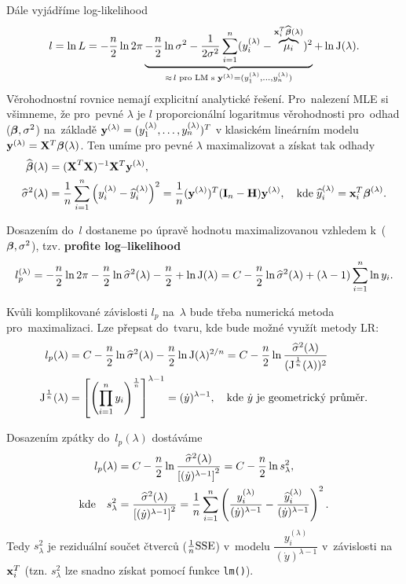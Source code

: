 Dále vyjádříme log-likelihood
 $$
 l = \ln L = -\frac{n}{2}\ln 2 \pi \underbrace{- \frac{n}{2}\ln \sigma^2 - \frac{1}{2 \sigma^2} \sum\limits_{i=1}^{n} (y_i^{(\lambda)} - \overbrace{\mu_i}^{\mathbf{x}_i^T \widehat{\boldsymbol{\beta}}(\lambda)})^2}_{\approx \, l \text{ pro LM s } \mathbf{y}^{(\lambda)} = (y_1^{(\lambda)}, \dots, y_n^{(\lambda)})} + \ln\text{J}(\lambda).
 $$
Věrohodnostní rovnice nemají explicitní analytické řešení. Pro~nalezení MLE si všimneme, že pro~pevné $\lambda$ je $l$ proporcionální logaritmus věrohodnosti pro~odhad ($\boldsymbol{\beta}, \sigma^2$) na~základě $\mathbf{y}^{(\lambda)} = (y_1^{(\lambda)},\dots, y_n^{(\lambda)})^T$ v klasickém lineárním modelu $\mathbf{y}^{(\lambda)} = \mathbf{X}^T \boldsymbol{\beta}(\lambda)$. Ten umíme pro pevné $\lambda$ maximalizovat a získat tak odhady
 \begin{align*}
 \widehat{\boldsymbol{\beta}} (\lambda) & = {(\textbf{X}^T\textbf{X})^{-1}} \mathbf{X}^T \mathbf{y}^{(\lambda)}, \\
\widehat{\sigma}^2 (\lambda) & = \frac{1}{n} \sum\limits_{i=1}^{n} \left(y_i^{(\lambda)} - \widehat{y} _i^{(\lambda)}\right)^2 = \frac{1}{n} (\mathbf{y}^{(\lambda)})^T (\textbf{I} _n - \textbf{H}) \mathbf{y}^{(\lambda)}, \quad \text{kde} \; \widehat{y}_i^{(\lambda)} = \mathbf{x}_i^T \boldsymbol{\beta}^{(\lambda)}.
 \end{align*}

Dosazením do~$l$ dostaneme po úpravě hodnotu maximalizovanou vzhledem k~($\boldsymbol{\beta}, \sigma^2$), tzv. \textbf{profite log--likelihood}
 $$
  l_p^{(\lambda)} = -\frac{n}{2} \ln 2 \pi - \frac{n}{2} \ln \widehat{\sigma}^2 (\lambda) - \frac{n}{2} + \ln \text{J}(\lambda)
 = C - \frac{n}{2} \ln \widehat{\sigma}^2 (\lambda) + (\lambda - 1)  \sum\limits_{i=1}^{n} \ln y_i.
 $$
\begin{remark}
Kvůli komplikované závislosti $l_p$ na~$\lambda$ bude třeba numerická metoda pro~maximalizaci. Lze přepsat do~tvaru, kde bude možné využít metody LR:
\begin{align*}
 l_p (\lambda) & = C - \frac{n}{2} \ln \widehat{\sigma}^2 (\lambda)  - \frac{n}{2} \ln\text{J}(\lambda)^{2/n} = C - \frac{n}{2} \ln \frac{ \widehat{\sigma}^2 (\lambda)}{(\text{J}^{\frac{1}{n}}(\lambda))^2} \\
 \text{J}^{\frac{1}{n}}(\lambda) & = \left[\left(\prod_{i = 1}^n y_i \right)^{\frac{1}{n}} \right]^{\lambda - 1} = (\dot{y})^{\lambda - 1}, \quad \text{kde } \dot{y} \text{ je geometrický průměr.}
\end{align*}
\end{remark}
Dosazením zpátky do~$l_p(\lambda)$ dostáváme
\begin{align*}
\quad  l_p(\lambda) & = C - \frac{n}{2} \ln \frac{ \widehat{\sigma}^2 (\lambda)}{\left[(\dot{y})^{\lambda - 1}\right]^2} = C - \frac{n}{2}\ln s_{\lambda}^2, \\
\text{kde} \quad s_{\lambda}^2 & = \frac{ \widehat{\sigma}^2 (\lambda)}{\left[(\dot{y})^{\lambda - 1}\right]^2} = \frac{1}{n} \sum\limits_{i=1}^{n} \left(\frac{y_i^{(\lambda)}}{(\dot{y})^{\lambda-1}} - \frac{\widehat{y}_i^{(\lambda)}}{(\dot{y})^{\lambda-1}} \right)^2.
\end{align*}
Tedy $s_{\lambda}^2$ je reziduální součet čtverců ($\frac{1}{n}\mathrm{SSE}$) v~modelu $\dfrac{y_i^{(\lambda)}}{(\dot{y})^{\lambda-1}}$ v~závislosti na~$\mathbf{x}_i^T$ (tzn. $s_{\lambda}^2$ lze snadno získat pomocí funkce \verb|lm()|).

